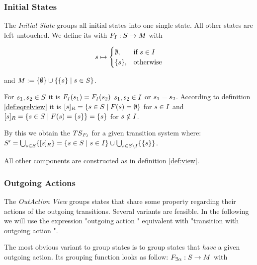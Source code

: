 \documentclass[preview]{standalone}
\begin{document}


\subsubsection{Initial States}
The \emph{Initial State \viewNC}  groups all initial states into one single state. All other states are left untouched.
We define its \grpfctN with ${F}_{I} : {S} \to {\ensuremath{{M}}}$ with 

\[
{s} \mapsto
\begin{cases}
	\emptyset,				& \text{if } {s} \in {I} \\
	\{{s}\},          	& \text{otherwise}
\end{cases}
\]

and ${{M}} := \{\emptyset\} \cup \{\{{s}\} \mid {s} \in {S}\}$.

For ${s}_1,{s}_2 \in {S}$ it is ${{{{F}}_{I}}}({s}_1) = {{{{F}}_{I}}}({s}_2)$ \iffN ${s}_1, {s}_2 \in {I}$ or ${s}_1 = {s}_2$. According to definition \ref{def:eqrelview} it is ${{[{s}]_{{R}}}} = \{{s} \in {S} \mid {F}({s}) = \emptyset\}$ for ${s} \in {I}$ and ${{[{s}]_{{R}}}} = \{{s} \in {S} \mid {F}({s}) = \{{s}\} \} = \{{s}\}$ for ${s} \notin {I}$.

By this we obtain the \viewN ${{{TS}_{{{{F}}_{I}}}}}$ for a given transition system \ts where: ${S}' = \bigcup_{{s} \in {S}} \{{{[{s}]_{{R}}}}\} = \{{s} \in {S} \mid {s} \in {I}\}\cup \bigcup_{{s} \in {S} \setminus {I}}\{\{{s}\}\}$.

All other components are constructed as in definition \ref{def:view}.

\subsubsection{Outgoing Actions}
The \emph{OutAction View} groups states that share some property regarding their actions  of the outgoing transitions. Several variants are feasible. In the following we will use the expression "outgoing action \action" equivalent with "transition with outgoing action \action".

The most obvious variant to group states is to group states that \emph{have} a given outgoing action. Its grouping function looks as follow: ${F}_{\exists{\alpha}} : {S} \to {\ensuremath{{M}}}$ with 
\end{document}
